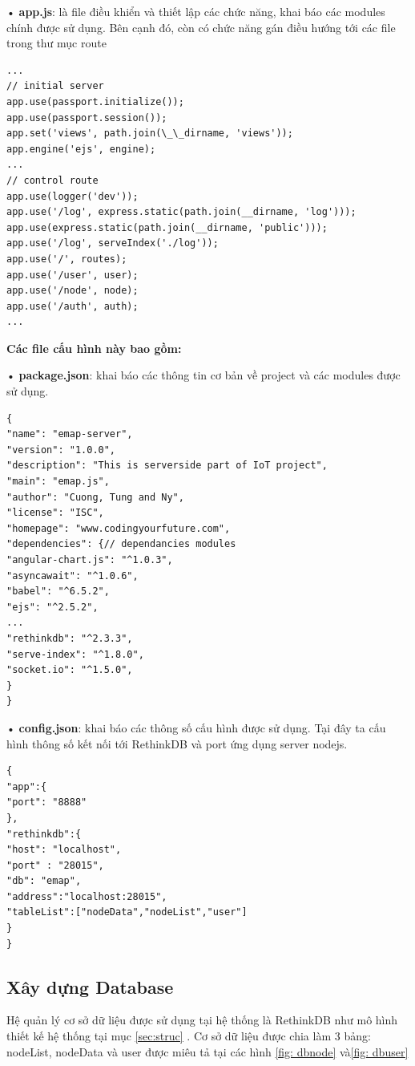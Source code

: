 • \textbf{app.js}: là file điều khiển và thiết lập các chức năng, khai báo các modules chính được sử dụng. Bên cạnh đó, còn có chức năng gán điều hướng tới các file trong thư mục route
\begin{lstlisting}[caption=app.js]
...
// initial server
app.use(passport.initialize());
app.use(passport.session());
app.set('views', path.join(\_\_dirname, 'views'));
app.engine('ejs', engine);
...
// control route
app.use(logger('dev'));
app.use('/log', express.static(path.join(__dirname, 'log')));
app.use(express.static(path.join(__dirname, 'public')));
app.use('/log', serveIndex('./log'));
app.use('/', routes);
app.use('/user', user);
app.use('/node', node);
app.use('/auth', auth);
...
\end{lstlisting}

\textbf{Các file cấu hình này bao gồm:}

• \textbf{package.json}: khai báo các thông tin cơ bản về project và các modules được sử dụng.
\begin{Verbatim}[xleftmargin=2em]
{
"name": "emap-server",
"version": "1.0.0",
"description": "This is serverside part of IoT project",
"main": "emap.js",
"author": "Cuong, Tung and Ny",
"license": "ISC",
"homepage": "www.codingyourfuture.com",
"dependencies": {// dependancies modules
"angular-chart.js": "^1.0.3",
"asyncawait": "^1.0.6",
"babel": "^6.5.2",
"ejs": "^2.5.2",
...
"rethinkdb": "^2.3.3",
"serve-index": "^1.8.0",
"socket.io": "^1.5.0",
}
}
\end{Verbatim}
• \textbf{config.json}: khai báo các thông số cấu hình được sử dụng. Tại đây ta cấu hình thông số kết nối tới RethinkDB và port ứng dụng server nodejs.
\begin{Verbatim}[xleftmargin=2em]
{
"app":{
"port": "8888"
},
"rethinkdb":{
"host": "localhost",
"port" : "28015",
"db": "emap",
"address":"localhost:28015",
"tableList":["nodeData","nodeList","user"]
}
}

\end{Verbatim}





\subsection{Xây dựng Database}
Hệ quản lý cơ sở dữ liệu được sử dụng tại hệ thống là RethinkDB như mô hình thiết kế hệ thống tại mục \ref{sec:struc} . Cơ sở dữ liệu được chia làm 3 bảng: nodeList, nodeData và user được miêu tả tại các hình \ref{fig: dbnode} và\ref{fig: dbuser}

